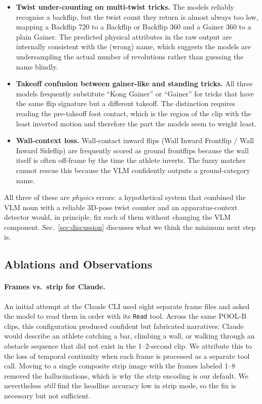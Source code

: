 \begin{itemize}
  \setlength\itemsep{-1pt}
  \item \textbf{Twist under-counting on multi-twist tricks.} The
        models reliably recognise a backflip, but the twist count
        they return is almost always too low, mapping a Backflip 720
        to a Backflip or Backflip 360 and a Gainer 360 to a plain
        Gainer. The predicted physical attributes in the raw output
        are internally consistent with the (wrong) name, which
        suggests the models are undersampling the actual number of
        revolutions rather than guessing the name blindly.
  \item \textbf{Takeoff confusion between gainer-like and standing
        tricks.} All three models frequently substitute ``Kong
        Gainer'' or ``Gainer'' for tricks that have the same flip
        signature but a different takeoff. The distinction requires
        reading the pre-takeoff foot contact, which is the region of
        the clip with the least inverted motion and therefore the
        part the models seem to weight least.
  \item \textbf{Wall-context loss.} Wall-contact inward flips
        (Wall Inward Frontflip / Wall Inward Sideflip) are frequently
        scored as ground frontflips because the wall itself is often
        off-frame by the time the athlete inverts. The fuzzy matcher
        cannot rescue this because the VLM confidently outputs a
        ground-category name.
\end{itemize}

All three of these are \emph{physics} errors: a hypothetical system
that combined the VLM noun with a reliable 3D-pose twist counter and
an apparatus-context detector would, in principle, fix each of them
without changing the VLM component. Sec.~\ref{sec:discussion}
discusses what we think the minimum next step is.

\subsection{Ablations and Observations}
\label{sec:experiments:ablations}

\paragraph{Frames vs.\ strip for Claude.}
An initial attempt at the Claude CLI used eight separate frame files
and asked the model to read them in order with its \texttt{Read}
tool. Across the same POOL-B clips, this configuration produced
confident but fabricated narratives: Claude would describe an
athlete catching a bar, climbing a wall, or walking through an
obstacle sequence that did not exist in the 1--2-second clip. We
attribute this to the loss of temporal continuity when each frame
is processed as a separate tool call. Moving to a single composite
strip image with the frames labeled 1--8 removed the hallucinations,
which is why the strip encoding is our default. We nevertheless
\emph{still} find the headline accuracy low in strip mode, so the
fix is necessary but not sufficient.

